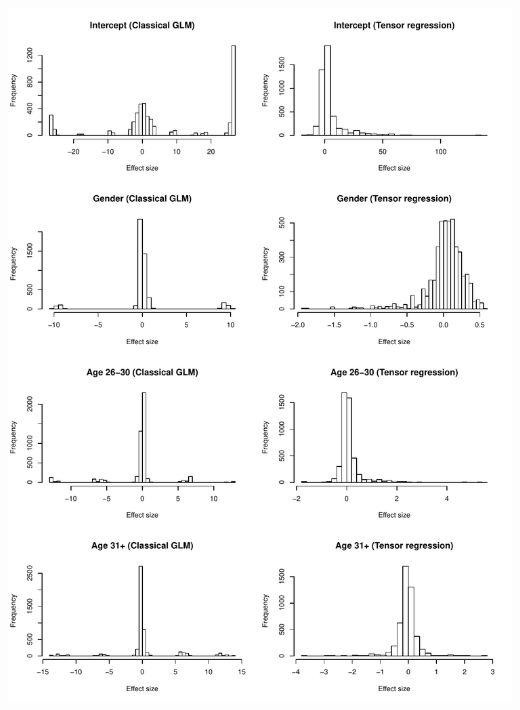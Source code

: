 \documentclass[11pt]{article}
\theoremstyle{plain}
\theoremstyle{definition}
\begin{document}
\includegraphics[width=17cm]{compare.pdf}



\end{document}
